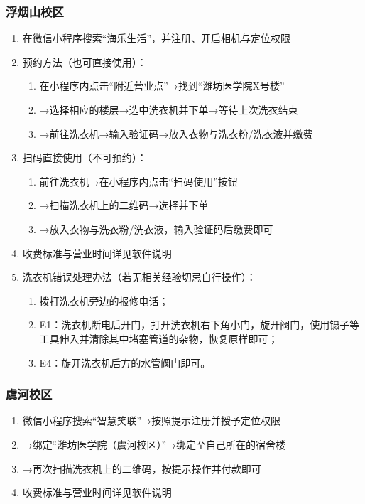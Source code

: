 \subsubsection[浮烟山校区]{浮烟山校区}
\label{washing_machine_f}
\begin{enumerate}
    \item 在微信小程序搜索“海乐生活”，并注册、开启相机与定位权限
    \item 预约方法（也可直接使用）：
          \begin{enumerate}
              \item 在小程序内点击“附近营业点”→找到“潍坊医学院X号楼”
              \item →选择相应的楼层→选中洗衣机并下单→等待上次洗衣结束
              \item →前往洗衣机→输入验证码→放入衣物与洗衣粉/洗衣液并缴费
          \end{enumerate}
    \item 扫码直接使用（不可预约）：
          \begin{enumerate}
              \item 前往洗衣机→在小程序内点击“扫码使用”按钮
              \item →扫描洗衣机上的二维码→选择并下单
              \item →放入衣物与洗衣粉/洗衣液，输入验证码后缴费即可
          \end{enumerate}
    \item 收费标准与营业时间详见软件说明
    \item 洗衣机错误处理办法（若无相关经验切忌自行操作）：
          \begin{enumerate}
              \item 拨打洗衣机旁边的报修电话；
              \item E1：洗衣机断电后开门，打开洗衣机右下角小门，旋开阀门，使用镊子等工具伸入并清除其中堵塞管道的杂物，恢复原样即可；
              \item E4：旋开洗衣机后方的水管阀门即可。
          \end{enumerate}
\end{enumerate}
\subsubsection[虞河校区]{虞河校区}
\label{washing_machine_y}
\begin{enumerate}
    \item 微信小程序搜索“智慧笑联”→按照提示注册并授予定位权限
    \item →绑定“潍坊医学院（虞河校区）”→绑定至自己所在的宿舍楼
    \item →再次扫描洗衣机上的二维码，按提示操作并付款即可
    \item 收费标准与营业时间详见软件说明
\end{enumerate}

